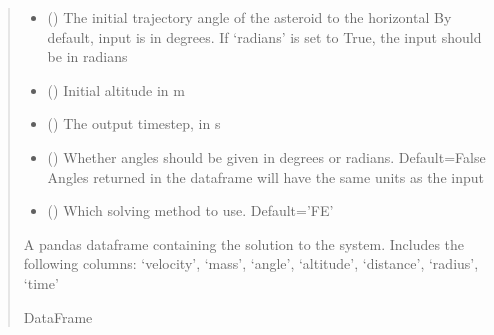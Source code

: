 \documentclass[letterpaper,10pt,english]{sphinxmanual}
\begin{document}
\begin{fulllineitems}
\begin{fulllineitems}
\begin{quote}
\begin{description}
\begin{itemize}
\item {} 
\sphinxAtStartPar
{} () \textendash{} The initial trajectory angle of the asteroid to the horizontal
By default, input is in degrees. If ‘radians’ is set to True, the
input should be in radians

\item {} 
\sphinxAtStartPar
{} (\sphinxstyleliteralemphasis{\sphinxupquote{, }}) \textendash{} Initial altitude in m

\item {} 
\sphinxAtStartPar
{} (\sphinxstyleliteralemphasis{\sphinxupquote{, }}) \textendash{} The output timestep, in s

\item {} 
\sphinxAtStartPar
{} (\sphinxstyleliteralemphasis{\sphinxupquote{, }}) \textendash{} Whether angles should be given in degrees or radians. Default=False
Angles returned in the dataframe will have the same units as the
input

\item {} 
\sphinxAtStartPar
{} (\sphinxstyleliteralemphasis{\sphinxupquote{, }}) \textendash{} Which solving method to use. Default=’FE’

\end{itemize}

\sphinxAtStartPar
{} \textendash{} A pandas dataframe containing the solution to the system.
Includes the following columns:
‘velocity’, ‘mass’, ‘angle’, ‘altitude’,
‘distance’, ‘radius’, ‘time’

\sphinxAtStartPar
DataFrame

\end{description}\end{quote}

\end{fulllineitems}


\end{fulllineitems}
\end{document}
